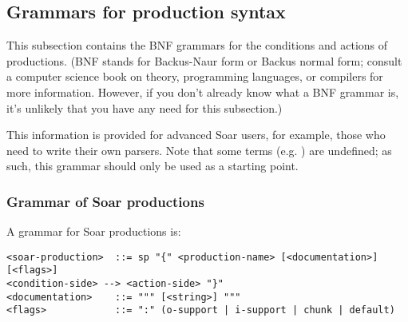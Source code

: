 \subsection{Grammars for production syntax} 
\label{GRAMMARS}

This subsection contains the BNF grammars for the conditions and actions of
productions. (BNF stands for Backus-Naur form or Backus normal form; consult a
computer science book on theory, programming languages, or compilers for more
information. However, if you don't already know what a BNF grammar is, it's
unlikely that you have any need for this subsection.)

This information is provided for advanced Soar users, for example, those who
need to write their own parsers. Note that some terms (e.g. )
are undefined; as such, this grammar should only be used as a starting point.




\subsubsection{Grammar of Soar productions}

A grammar for Soar productions is:
\begin{verbatim}
<soar-production>  ::= sp "{" <production-name> [<documentation>] [<flags>]
<condition-side> --> <action-side> "}"
<documentation>    ::= """ [<string>] """
<flags>            ::= ":" (o-support | i-support | chunk | default)
\end{verbatim}

